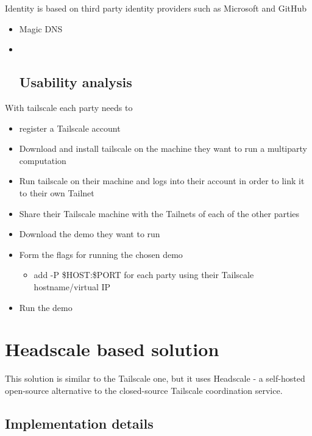 Identity is based on third party identity providers such as Microsoft
and GitHub

\begin{itemize}
\item
  Magic DNS
\item ~
  \hypertarget{usability-analysis}{%
  \section{Usability analysis}\label{usability-analysis}}
\end{itemize}

With tailscale each party needs to

\begin{itemize}
\tightlist
\item
  register a Tailscale account
\item
  Download and install tailscale on the machine they want to run a
  multiparty computation
\item
  Run tailscale on their machine and logs into their account in order to
  link it to their own Tailnet
\item
  Share their Tailscale machine with the Tailnets of each of the other
  parties
\item
  Download the demo they want to run
\item
  Form the flags for running the chosen demo

  \begin{itemize}
  \tightlist
  \item
    add -P \$HOST:\$PORT for each party using their Tailscale
    hostname/virtual IP
  \end{itemize}
\item
  Run the demo
\end{itemize}

\hypertarget{headscale-based-solution}{%
\chapter{Headscale based solution}\label{headscale-based-solution}}

This solution is similar to the Tailscale one, but it uses Headscale - a
self-hosted open-source alternative to the closed-source Tailscale
coordination service.

\hypertarget{implementation-details}{%
\section{Implementation details}\label{implementation-details}}

